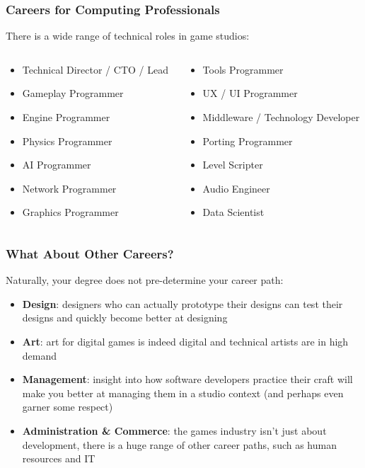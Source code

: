 \begin{frame}
	\frametitle{Careers for Computing Professionals}
	
	There is a wide range of technical roles in game studios:
	
	\begin{columns}
		\begin{column}{0.5\textwidth}
			\begin{itemize}
				\item Technical Director / CTO / Lead
				\item Gameplay Programmer
				\item Engine Programmer
				\item Physics Programmer
				\item AI Programmer
				\item Network Programmer
				\item Graphics Programmer
			\end{itemize}
		\end{column}
		\begin{column}{0.5\textwidth}
			\begin{itemize}
				\item Tools Programmer
				\item UX / UI Programmer
				\item Middleware / Technology Developer
				\item Porting Programmer
				\item Level Scripter
				\item Audio Engineer
				\item Data Scientist
			\end{itemize}
		\end{column}
	\end{columns}
\end{frame}

\begin{frame}
	\frametitle{What About Other Careers?}
	
	Naturally, your degree does not pre-determine your career path:
	
	\begin{itemize}
		\item 	\textbf{Design}: designers who can actually prototype their designs can test their designs and quickly become better at designing \pause
		\item 	\textbf{Art}: art for digital games is indeed digital and technical artists are in high demand \pause
		\item 	\textbf{Management}: insight into how software developers practice their craft will make you better at managing them in a studio context 
			(and perhaps even garner some respect) \pause
		\item 	\textbf{Administration \& Commerce}: the games industry isn't just about development, there is a huge range of other career paths,
			such as human resources and IT
	\end{itemize}
\end{frame}

